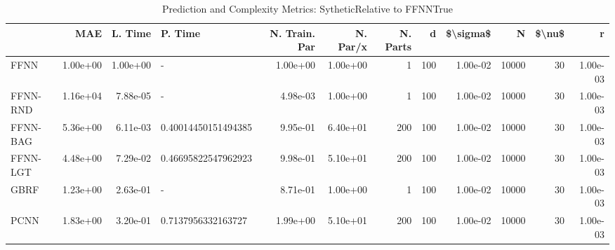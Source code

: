\begin{table}
\centering
\caption{Prediction and Complexity Metrics: SytheticRelative to FFNNTrue}
\label{tab__Sythetic__Fix_Neurons_QTrue}
\begin{tabular}{lrrlrrrrrrrr}
\toprule
{} &      MAE &  L. Time &              P. Time &  N. Train. Par &  N. Par/x &  N. Parts &    d &  \$\textbackslash sigma\$ &      N &  \$\textbackslash nu\$ &        r \\
\midrule
FFNN     & 1.00e+00 & 1.00e+00 &                    - &       1.00e+00 &  1.00e+00 &         1 &  100 &  1.00e-02 &  10000 &     30 & 1.00e-03 \\
FFNN-RND & 1.16e+04 & 7.88e-05 &                    - &       4.98e-03 &  1.00e+00 &         1 &  100 &  1.00e-02 &  10000 &     30 & 1.00e-03 \\
FFNN-BAG & 5.36e+00 & 6.11e-03 &  0.40014450151494385 &       9.95e-01 &  6.40e+01 &       200 &  100 &  1.00e-02 &  10000 &     30 & 1.00e-03 \\
FFNN-LGT & 4.48e+00 & 7.29e-02 &  0.46695822547962923 &       9.98e-01 &  5.10e+01 &       200 &  100 &  1.00e-02 &  10000 &     30 & 1.00e-03 \\
GBRF     & 1.23e+00 & 2.63e-01 &                    - &       8.71e-01 &  1.00e+00 &         1 &  100 &  1.00e-02 &  10000 &     30 & 1.00e-03 \\
PCNN     & 1.83e+00 & 3.20e-01 &   0.7137956332163727 &       1.99e+00 &  5.10e+01 &       200 &  100 &  1.00e-02 &  10000 &     30 & 1.00e-03 \\
\bottomrule
\end{tabular}
\end{table}
